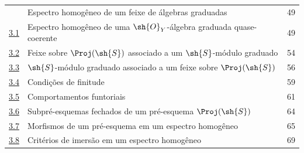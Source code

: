 \documentclass[oneside,10pt]{amsart}
\newcommand{\oldpage}[2][]{\marginnote{\normalfont\footnotesize\textbf{#1}~|~#2}\ignorespaces}
\begin{document}
\begin{longtable}{@{}p{}p{}r@{}}
\hyperref[section:II.3]{\textsection3} & Espectro homogêneo de um feixe de álgebras graduadas & 49\\
\hyperref[subsection:II.3.1]{3.1} & Espectro homogêneo de uma $\sh{O}_Y$-álgebra graduada quase-coerente & 49\\
\hyperref[subsection:II.3.2]{3.2} & Feixe sobre $\Proj(\sh{S})$ associado a um $\sh{S}$-módulo graduado & 54\\
\hyperref[subsection:II.3.3]{3.3} & $\sh{S}$-módulo graduado associado a um feixe sobre $\Proj(\sh{S})$ & 56\\
\hyperref[subsection:II.3.4]{3.4} & Condições de finitude & 59\\
\hyperref[subsection:II.3.5]{3.5} & Comportamentos funtoriais & 61\\
\hyperref[subsection:II.3.6]{3.6} & Subpré-esquemas fechados de um pré-esquema $\Proj(\sh{S})$ & 64\\
\hyperref[subsection:II.3.7]{3.7} & Morfismos de um pré-esquema em um espectro homogêneo & 65\\
\hyperref[subsection:II.3.8]{3.8} & Critérios de imersão em um espectro homogêneo & 69\\
\end{longtable}
\oldpage[II]{214}
\end{document}
